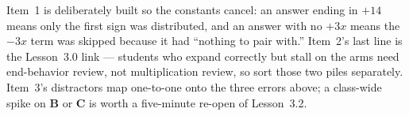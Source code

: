 \documentclass[10pt]{article}
\begin{document}
\begin{teachernote}
Item~1 is deliberately built so the constants cancel: an answer ending in $+14$ means only the first
sign was distributed, and an answer with no $+3x$ means the $-3x$ term was skipped because it had
``nothing to pair with.'' Item~2's last line is the Lesson~3.0 link --- students who expand correctly
but stall on the arms need end-behavior review, not multiplication review, so sort those two piles
separately. Item~3's distractors map one-to-one onto the three errors above; a class-wide spike on
\textbf{B} or \textbf{C} is worth a five-minute re-open of Lesson~3.2.
\end{teachernote}
\end{document}
